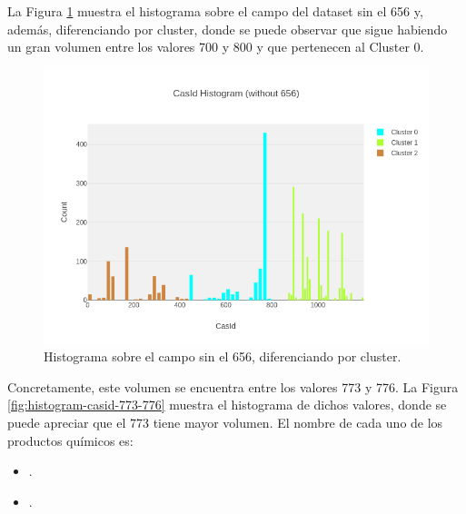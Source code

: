 La Figura \ref{fig:histogram-casid-without656} muestra el histograma sobre el campo  del dataset sin el  656 y, además, diferenciando por cluster, donde se puede observar que sigue habiendo un gran volumen entre los valores 700 y 800 y que pertenecen al Cluster 0.


\newpage
\begin{figure}[!th]
\includegraphics[scale=0.5]{figures/histogram-casid-without656}
\centering
\caption{Histograma sobre el campo  sin el  656, diferenciando por cluster.}
\label{fig:histogram-casid-without656}
\end{figure}

Concretamente, este volumen se encuentra entre los valores 773 y 776. La Figura \ref{fig:histogram-casid-773-776} muestra el histograma de dichos valores, donde se puede apreciar que el  773 tiene mayor volumen. El nombre de cada uno de los productos químicos es:

\begin{itemize}
 \item {}.
 \item {}.
\end{itemize}

